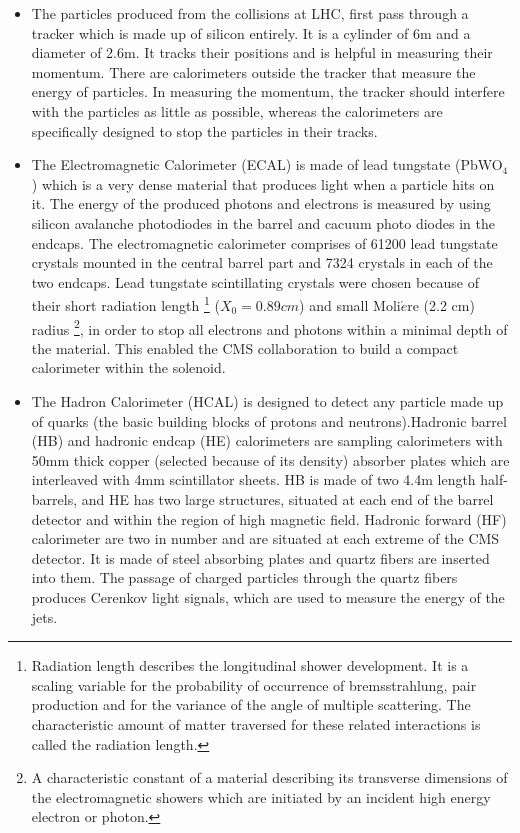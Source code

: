  \begin{itemize}
\item
The particles produced from the collisions at LHC, first pass through a tracker which is made up of silicon entirely. It is a cylinder of 6m and a diameter of 2.6m. It tracks their positions and is helpful in measuring their momentum. There are calorimeters outside the tracker that measure the energy of particles. In measuring the momentum, the tracker should interfere with the particles as little as possible, whereas the calorimeters are specifically designed to stop the particles in their tracks.
 \item
The Electromagnetic Calorimeter (ECAL) is made of lead tungstate (PbWO$_{4}$) which is a very dense material that produces light when a particle hits on it. The energy of the produced photons and electrons is measured by using silicon avalanche photodiodes in the barrel and cacuum photo diodes in the endcaps. The electromagnetic calorimeter comprises of 61200 lead tungstate crystals mounted in the central barrel part and 7324 crystals in each of the two endcaps. Lead tungstate scintillating crystals were chosen because of their short radiation length \footnote{Radiation length describes the longitudinal shower development. It is a scaling variable for the probability of occurrence of bremsstrahlung, pair production and for the variance of the angle of multiple scattering. The characteristic amount of matter traversed for these related interactions is called the radiation length.} ($X_{0} = 0.89cm$) and
small Moli$\acute{e}$re (2.2 cm) radius \footnote{ A characteristic constant of a  material describing its transverse dimensions of the electromagnetic showers which are initiated by an incident high energy electron or photon.}, in order to stop all
electrons and photons within a minimal depth of the material.
This enabled the CMS collaboration to build a compact calorimeter within the solenoid.

\item
The Hadron Calorimeter (HCAL) is designed to detect any particle made up of quarks (the basic building blocks of protons and neutrons).Hadronic barrel (HB) and hadronic endcap (HE) calorimeters are sampling calorimeters with 50mm thick copper (selected because of its density) absorber plates which are interleaved with 4mm scintillator sheets. HB is made of two 4.4m length half-barrels, and HE has two large structures, situated at each end of the barrel detector and within the region of high magnetic field. Hadronic forward (HF) calorimeter are two in number and are situated at each extreme of the CMS
detector. It is made of steel absorbing plates and quartz fibers are inserted into
them. The passage of charged particles through the quartz fibers produces Cerenkov
light signals, which are used to measure the energy of the jets.


\end{itemize}
